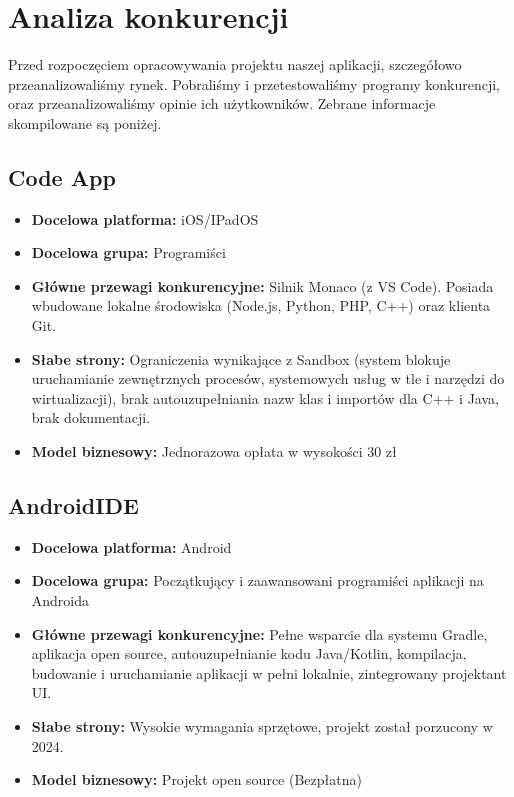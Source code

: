 \chapter{Analiza konkurencji}

Przed rozpoczęciem opracowywania projektu naszej aplikacji, szczegółowo przeanalizowaliśmy rynek. Pobraliśmy i przetestowaliśmy programy konkurencji, oraz przeanalizowaliśmy opinie ich użytkowników. Zebrane informacje skompilowane są poniżej.

\section{Code App}
\begin{itemize}
    \item \textbf{Docelowa platforma:} iOS/IPadOS
    \item \textbf{Docelowa grupa:} Programiści 
    \item \textbf{Główne przewagi konkurencyjne:} Silnik Monaco (z VS Code). Posiada wbudowane lokalne środowiska (Node.js, Python, PHP, C++) oraz klienta Git. 
    \item \textbf{Słabe strony:} Ograniczenia wynikające z Sandbox (system blokuje uruchamianie zewnętrznych procesów, systemowych usług w tle i narzędzi do wirtualizacji), brak autouzupełniania nazw klas i importów dla C++ i Java, brak dokumentacji. 
    \item \textbf{Model biznesowy:} Jednorazowa opłata w wysokości 30 zł
\end{itemize}

\newpage
\section{AndroidIDE}
\begin{itemize}
    
    \item \textbf{Docelowa platforma:} Android
    \item \textbf{Docelowa grupa:} Początkujący i zaawansowani programiści aplikacji na Androida 
    \item \textbf{Główne przewagi konkurencyjne:} Pełne wsparcie dla systemu Gradle, aplikacja open source, autouzupełnianie kodu Java/Kotlin, kompilacja, budowanie i uruchamianie aplikacji w pełni lokalnie, zintegrowany projektant UI. 
    \item \textbf{Słabe strony:} Wysokie wymagania sprzętowe, projekt został porzucony w 2024. 
    \item \textbf{Model biznesowy:} Projekt open source (Bezpłatna) 
\end{itemize}

